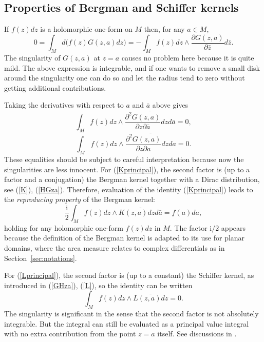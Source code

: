 \documentclass[reqno,12pt]{article}
\theoremstyle{plain}
\theoremstyle{definition}
\numberwithin{equation}{section}
\numberwithin{figure}{section}
\def\I{\mathrm{i}}
\begin{document}

\subsection{Properties of Bergman and Schiffer kernels}\label{sec:Bergman and Schiffer}

If $f(z)dz$ is a holomorphic one-form on $M$ then, for any $a\in M$,
$$
0=\int_M d\big(f(z)G(z,a)dz\big)=-\int_M f(z)dz\wedge \frac{\partial G(z,a)}{\partial \bar{z}}d\bar{z}.
$$
The singularity of $G(z,a)$ at $z=a$ causes no problem here because it is quite mild. The
above expression is integrable, and if one wants to remove a small disk around the singularity one can 
do so and let the radius tend to zero without getting additional contributions.

Taking the derivatives with respect to $a$ and $\bar{a}$ above gives
\begin{equation}\label{Kprincipal}
\int_M f(z)dz \wedge\overline{\frac{\partial^2 G(z,a)}{\partial z\partial \bar{a}}dzd\bar{a}}=0,
\end{equation}
\begin{equation}\label{Lprincipal}
\int_M f(z)dz \wedge\overline{\frac{\partial^2 G(z,a)}{\partial z\partial {a}}dzd{a}}=0.
\end{equation}
These equalities should be subject to careful interpretation because now the singularities are less innocent.
For (\ref{Kprincipal}), the second factor is (up to a factor and a conjugation) the 
Bergman kernel together with a Dirac
distribution, see (\ref{K}), (\ref{HGza}). Therefore, evaluation of the identity (\ref{Kprincipal})
leads to the {\it reproducing property} of the Bergman kernel:
\begin{equation}\label{Kreproducing}
\frac{\I}{2}\int_M f(z)dz \wedge \overline{K(z,a)dzd\bar{a}}=f(a)da,
\end{equation}
holding for any holomorphic one-form $f(z)dz$ in $M$.
The factor $\I/2$ appears because the definition of the Bergman kernel is adapted to its use for planar domains,
where the area measure relates to complex differentials as in Section~\ref{sec:notations}.
 
For (\ref{Lprincipal}), the second factor is (up to a constant) the Schiffer kernel, as introduced in (\ref{GHza}), (\ref{L}),
so the identity can be written
\begin{equation}\label{Lprincipal1}
\int_M f(z)dz \wedge \overline{L(z,a)dz}=0. 
\end{equation}
The singularity is significant in the sense that the second factor is not
absolutely integrable. But the integral can still be evaluated as a principal value
integral with no extra contribution from the point $z=a$ itself. 
See discussions in \cite{Schiffer-Spencer-1954}.
\end{document}
